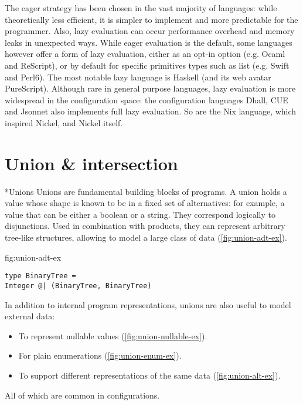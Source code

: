 \documentclass[sigplan,10pt,review,anonymous]{acmart}
\newcommand{\info}[2][1=]{}
\newcommand{\change}[2]{}
\newcommand{\resolved}[2]{}
\begin{document}
The eager strategy has been chosen in the vast majority of languages: while
theoretically less efficient, it is simpler to implement and more predictable
for the programmer. Also, lazy evaluation can occur performance overhead and
memory leaks in unexpected ways. While eager evaluation is the default, some
languages however offer a form of lazy evaluation, either as an opt-in option
(e.g. Ocaml and ReScript), or by default for specific primitives types such as
list (e.g.  Swift and Perl6). The most notable lazy language is Haskell
(and its web avatar PureScript). Although rare in general purpose languages,
lazy evaluation is more widespread in the configuration space: the configuration
languages Dhall, CUE and Jsonnet also implements full lazy evaluation. So are
the Nix language, which inspired Nickel, and Nickel itself.

\newpage

\section{Union \& intersection}
\label{sec:union-inter}
\info{What are they, what are they used for.}
\resolved{Since nickel uses | for contract application, I'd move unions
to some other symbol.
I think the best option is to move to $\cap / \cup$}

\subsection*{Unions}
Unions are fundamental building blocks of programs. A union holds a value whose
shape is known to be in a fixed set of alternatives: for example, a value that
can be either a boolean or a string. They correspond logically to disjunctions.
Used in combination with products, they can represent arbitrary tree-like
structures, allowing to model a large class of data
(\ref{fig:union-adt-ex}).


\change{These next few labels need to be inside figures,
they are not working}
\label{fig:union-adt-ex}
\begin{lstlisting}[title={Tree-like data structure}]
type BinaryTree =
Integer @| (BinaryTree, BinaryTree)
\end{lstlisting}


In addition to internal program representations, unions are also useful to model
external data:
\begin{itemize}
    \item To represent nullable values (\ref{fig:union-nullable-ex}).
    \item For plain enumerations (\ref{fig:union-enum-ex}).
    \item To support different representations of the same data
        (\ref{fig:union-alt-ex}).
\end{itemize}
All of which are common in configurations.
\end{document}
